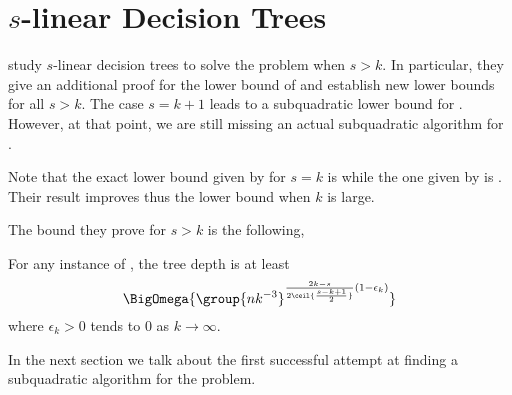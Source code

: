 \section{$s$-linear Decision Trees}

\citet*{ailon:2005} study $s$-linear decision trees to solve the \kSUM
problem when $s > k$. In particular, they give an additional proof for the
 lower bound of \citet{erickson:1999} and
establish new lower bounds for all $s > k$. The case $s = k+1$ leads to a
subquadratic lower bound for \threeSUM. However, at that point, we are still
missing an actual subquadratic algorithm for \threeSUM.

Note that the exact lower bound given by \citet*{erickson:1999} for \(s = k\) is
 while the one given by
\citet*{ailon:2005} is . Their result
improves thus the lower bound when \(k\) is large.

The bound they prove for \(s > k\) is the following,
\begin{theorem}
For any instance of \kLDT, the tree depth is at least
\begin{displaymath}
\BigOmega{\group{nk^{-3}}^{\frac{2k-s}{2\ceil{\frac{s-k+1}{2}}} (1-\epsilon_k) }}
\end{displaymath}
where \(\epsilon_k > 0\) tends to \(0\) as \(k \to\infty\).
\end{theorem}

In the next section we talk about the first successful attempt at finding
a subquadratic algorithm for the \threeSUM problem.
